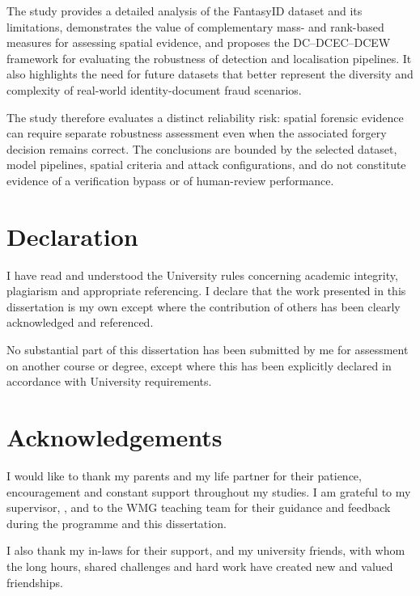 The study provides a detailed analysis of the FantasyID dataset and its limitations, demonstrates the value of complementary mass- and rank-based measures for assessing spatial evidence, and proposes the DC--DCEC--DCEW framework for evaluating the robustness of detection and localisation pipelines. It also highlights the need for future datasets that better represent the diversity and complexity of real-world identity-document fraud scenarios.

The study therefore evaluates a distinct reliability risk: spatial forensic evidence can require separate robustness assessment even when the associated forgery decision remains correct. The conclusions are bounded by the selected dataset, model pipelines, spatial criteria and attack configurations, and do not constitute evidence of a verification bypass or of human-review performance.
\clearpage
\chapter*{Declaration}
{}

I have read and understood the University rules concerning academic integrity, plagiarism and appropriate referencing. I declare that the work presented in this dissertation is my own except where the contribution of others has been clearly acknowledged and referenced.

No substantial part of this dissertation has been submitted by me for assessment on another course or degree, except where this has been explicitly declared in accordance with University requirements.


\clearpage
\chapter*{Acknowledgements}
{}

I would like to thank my parents and my life partner for their patience, encouragement and constant support throughout my studies. I am grateful to my supervisor, \supervisorname, and to the WMG teaching team for their guidance and feedback during the programme and this dissertation.

I also thank my in-laws for their support, and my university friends, with whom the long hours, shared challenges and hard work have created new and valued friendships.
